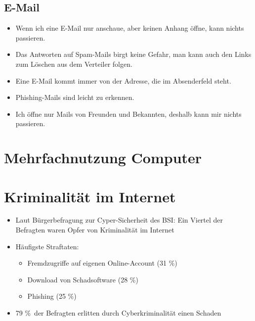 \subsection{E-Mail}

\begin{frame}
\begin{itemize}
	\item Wenn ich eine E-Mail nur anschaue, aber keinen Anhang öffne, kann nichts passieren.
	\item Das Antworten auf Spam-Mails birgt keine Gefahr, man kann auch den Links zum Löschen aus dem Verteiler folgen.
	\item Eine E-Mail kommt immer von der Adresse, die im Absenderfeld steht.
	\item Phishing-Mails sind leicht zu erkennen.
	\item Ich öffne nur Mails von Freunden und Bekannten, deshalb kann mir nichts passieren.
\end{itemize}
\end{frame}

\section{Mehrfachnutzung Computer}


\section{Kriminalität im Internet}

\begin{frame}
\begin{itemize}
  \item Laut Bürgerbefragung zur Cyper-Sicherheit des BSI: Ein Viertel der Befragten waren Opfer von Kriminalität im Internet
  \item Häufigste Straftaten:
  \begin{itemize}
    \item Fremdzugriffe auf eigenen Online-Account (31 \%)
    \item Download von Schadsoftware (28 \%)
    \item Phishing (25 \%)
  \end{itemize}
  \item 79 \%\ der Befragten erlitten durch Cyberkriminalität einen Schaden
\end{itemize}
\end{frame}


